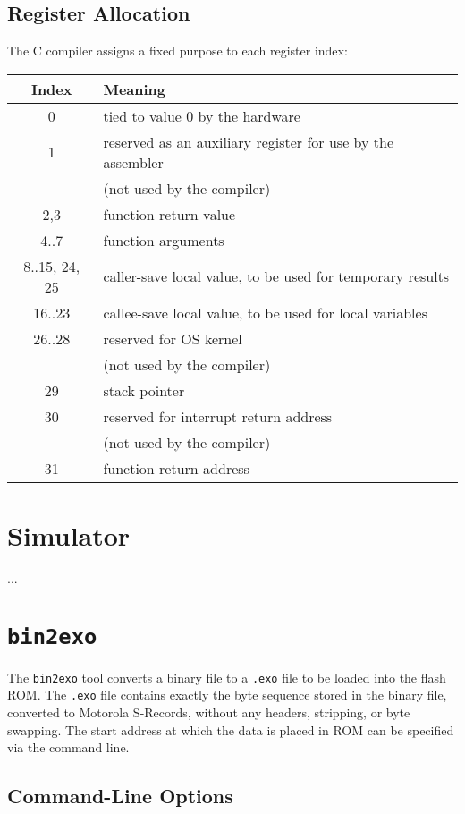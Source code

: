 \subsection{Register Allocation}

The C compiler assigns a fixed purpose to each register index:

\begin{tabular}{|c|l|}
\hline
Index & Meaning\\
\hline
0 & tied to value 0 by the hardware\\
\hline
1 & reserved as an auxiliary register for use by the assembler\\
& (not used by the compiler)\\
\hline
2,3 & function return value\\
\hline
4..7 & function arguments\\
\hline
8..15, 24, 25 & caller-save local value, to be used for temporary results\\
\hline
16..23 & callee-save local value, to be used for local variables\\
\hline
26..28 & reserved for OS kernel\\
& (not used by the compiler)\\
\hline
29 & stack pointer\\
\hline
30 & reserved for interrupt return address \\
& (not used by the compiler)\\
\hline
31 & function return address\\
\hline
\end{tabular}

\section{Simulator}

...

\section{\tt bin2exo}

The {\tt bin2exo} tool converts a binary file to a {\tt .exo} file to be loaded into the flash ROM. The {\tt .exo} file contains exactly the byte sequence stored in the binary file, converted to Motorola S-Records, without any headers, stripping, or byte swapping. The start address at which the data is placed in ROM can be specified via the command line.

\subsection{Command-Line Options}


